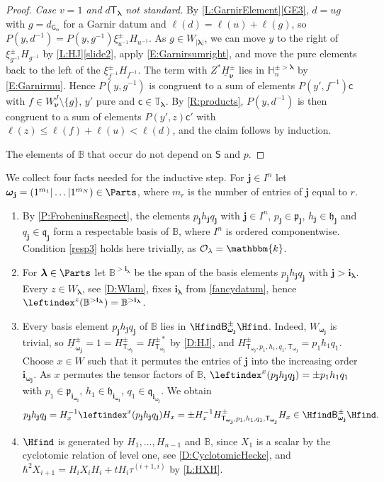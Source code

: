 \documentclass[a4paper,11pt]{amsart}
\newcommand\blam{{\boldsymbol\lambda}}
\newcommand\bnu{{\boldsymbol\nu}}
\newcommand\bom{{\boldsymbol\omega}}
\newcommand\bi{\mathbf{i}}
\newcommand\bj{\mathbf{j}}
\newcommand\ilam[1][\blam]{\bi_{#1}}
\numberwithin{equation}{subsection}
\theoremstyle{definition}
\theoremstyle{theorem}
\theoremstyle{remark}
\newcommand\CO{\mathcal{O}}
\newcommand\plam[1][\lambda]{\mathfrak{p}_{#1}}
\newcommand\hlam[1][\lambda]{\mathfrak{h}_{#1}}
\newcommand\qlam[1][\lambda]{\mathfrak{q}_{#1}}
\newcommand\Olam[1][\lambda]{\CO_{#1}}
\newcommand\HH{\mathbb{H}}
\newcommand\HJpm{\underline{H}^\pm}
\newcommand\Sym{W}
\newcommand\Basis[1][\pm]{\mathsf{B}^{#1}}
\newcommand\xipm{\xi^\pm}
\newcommand\bc{\mathsf{c}}
\newcommand\bS{{\mathsf{S}}}
\newcommand\bG{\mathsf{G}}
\newcommand\Tlam[1][\blam]{{\mathsf{T}_{#1}}}
\newcommand\taui[1][i]{\tau^{(#1)}}
\newcommand\kk{\mathbbm{k}}
\newcommand\Tos{\mathbb{T}}
\newcommand{\Bo}{\mathbb{B}}
\begin{document}
\begin{proof}
  \emph{Case $v=1$ and $d\Tlam$ not standard.} By \autoref{L:GarnirElement}\autoref{GE3}, $d=ug$ with $g=d_{\bG_\alpha}$ for a Garnir datum and $\ell(d)=\ell(u)+\ell(g)$, so $P(y,d^{-1})=P(y,g^{-1})\xipm_{u^{-1}}H_{u^{-1}}$. As $g\in\Sym_{|\blam|}$, we can move $y$ to the right of $\xipm_{g^{-1}}H_{g^{-1}}$ by \autoref{L:HJ}\autoref{slide2}, apply \autoref{E:Garnirsumright}, and move the pure elements back to the left of the $\xipm_{f^{-1}}H_{f^{-1}}$. The term with $Z^*\HJpm_\bnu$ lies in $\HH^{\pm>\blam}_n$ by \autoref{E:Garnirmu}. Hence $P(y,g^{-1})$ is congruent to a sum of elements $P(y',f^{-1})\bc$ with $f\in\Sym^J_\bnu\setminus\{g\}$, $y'$ pure and $\bc\in\Tos_\blam$. By \autoref{R:products}, $P(y,d^{-1})$ is then congruent to a sum of elements $P(y',z)\bc'$ with $\ell(z)\le\ell(f)+\ell(u)<\ell(d)$, and the claim follows by induction.

  The elements of $\Bo$ that occur do not depend on $\bS$ and $p$.
\end{proof}

We collect four facts needed for the inductive step. For $\bj\in I^n$ let $\bom_\bj=(1^{m_1}|\dots|1^{m_N})\in\Parts$, where $m_r$ is the number of entries of $\bj$ equal to $r$.
\begin{enumerate}[label=\upshape(F\arabic*), ref=\upshape(F\arabic*)]
\item\label{F1} By \autoref{P:FrobeniusRespect}, the elements $p_\bj h_\bj q_\bj$ with $\bj\in I^n$, $p_\bj\in\plam[\bj]$, $h_\bj\in\hlam[\bj]$ and $q_\bj\in\qlam[\bj]$ form a respectable basis of $\Bo$, where $I^n$ is ordered componentwise. Condition \autoref{resp3} holds here trivially, as $\Olam=\kk$.
\item\label{F2} For $\blam\in\Parts$ let $\Bo^{>\ilam}$ be the span of the basis elements $p_\bj h_\bj q_\bj$ with $\bj>\ilam$. Every $z\in\Sym_\blam$, see \autoref{D:Wlam}, fixes $\ilam$ from \autoref{fancydatum}, hence $\leftindex^z{(\Bo^{>\ilam})}=\Bo^{>\ilam}$.
\item\label{F3} Every basis element $p_\bj h_\bj q_\bj$ of $\Bo$ lies in $\Hfind\Basis_{\bom_\bj}\Hfind$. Indeed, $\Sym_{\bom_\bj}$ is trivial, so $\HJpm_{\bom_\bj}=1=H^\pm_{\Tlam[\bom_\bj]}=H^{\pm*}_{\Tlam[\bom_\bj]}$ by \autoref{D:HJ}, and $H^\pm_{\Tlam[\bom_\bj],p_1,h_1,q_1,\Tlam[\bom_\bj]}=p_1h_1q_1$.
\noindent Choose $x\in\Sym$ such that it  permutes the entries of $\bj$ into the increasing order $\bi_{\bom_\bj}$. As $x$ permutes the tensor factors of $\Bo$, $\leftindex^x{(p_\bj h_\bj q_\bj)}=\pm p_1h_1q_1$ with $p_1\in\plam[\bi_{\bom_\bj}]$, $h_1\in\hlam[\bi_{\bom_\bj}]$, $q_1\in\qlam[\bi_{\bom_\bj}]$. We obtain
\begin{equation*}
  p_\bj h_\bj q_\bj=H_x^{-1}\leftindex^x{(p_\bj h_\bj q_\bj)}H_x
    =\pm H_x^{-1}H^\pm_{\Tlam[\bom_\bj],p_1,h_1,q_1,\Tlam[\bom_\bj]}H_x
    \in\Hfind\Basis_{\bom_\bj}\Hfind.
\end{equation*}
\item\label{F4} $\Hfind$ is generated by $H_1,\dots,H_{n-1}$ and $\Bo$, since $X_1$ is a scalar by the cyclotomic relation of level one, see \autoref{D:CyclotomicHecke}, and $\hbar^2X_{i+1}=H_iX_iH_i+tH_i\taui[i+1,i]$ by \autoref{L:HXH}.
\end{enumerate}
\end{document}
